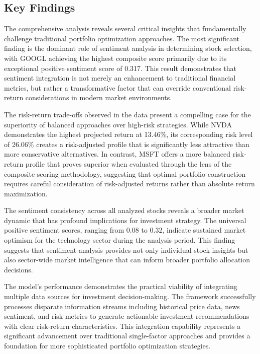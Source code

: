 \documentclass[12pt,a4paper]{article}
\begin{document}
\subsection{Key Findings}

The comprehensive analysis reveals several critical insights that fundamentally challenge traditional portfolio optimization approaches. The most significant finding is the dominant role of sentiment analysis in determining stock selection, with GOOGL achieving the highest composite score primarily due to its exceptional positive sentiment score of 0.317. This result demonstrates that sentiment integration is not merely an enhancement to traditional financial metrics, but rather a transformative factor that can override conventional risk-return considerations in modern market environments.

The risk-return trade-offs observed in the data present a compelling case for the superiority of balanced approaches over high-risk strategies. While NVDA demonstrates the highest projected return at 13.46\%, its corresponding risk level of 26.06\% creates a risk-adjusted profile that is significantly less attractive than more conservative alternatives. In contrast, MSFT offers a more balanced risk-return profile that proves superior when evaluated through the lens of the composite scoring methodology, suggesting that optimal portfolio construction requires careful consideration of risk-adjusted returns rather than absolute return maximization.

The sentiment consistency across all analyzed stocks reveals a broader market dynamic that has profound implications for investment strategy. The universal positive sentiment scores, ranging from 0.08 to 0.32, indicate sustained market optimism for the technology sector during the analysis period. This finding suggests that sentiment analysis provides not only individual stock insights but also sector-wide market intelligence that can inform broader portfolio allocation decisions.

The model's performance demonstrates the practical viability of integrating multiple data sources for investment decision-making. The framework successfully processes disparate information streams including historical price data, news sentiment, and risk metrics to generate actionable investment recommendations with clear risk-return characteristics. This integration capability represents a significant advancement over traditional single-factor approaches and provides a foundation for more sophisticated portfolio optimization strategies.
\end{document}
